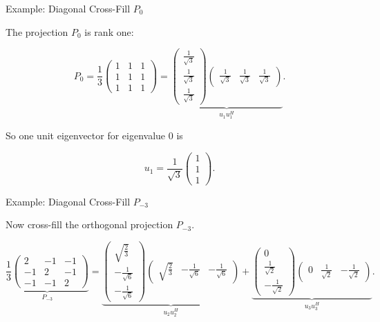 \documentclass[10pt]{beamer}
\theoremstyle{definition}
\begin{document}
\begin{frame}{Example: Diagonal Cross-Fill $P_0$}

The projection $P_0$ is rank one:

\[
P_0=
\frac13
\begin{pmatrix}
1&1&1\\
1&1&1\\
1&1&1
\end{pmatrix}
=
\underbrace{
\begin{pmatrix}
\frac1{\sqrt3}\\[0.2em]
\frac1{\sqrt3}\\[0.2em]
\frac1{\sqrt3}
\end{pmatrix}
\begin{pmatrix}
\frac1{\sqrt3}&\frac1{\sqrt3}&\frac1{\sqrt3}
\end{pmatrix}}_{u_1u_1^H}.
\]

\vfill

So one unit eigenvector for eigenvalue $0$ is

$$
u_1=\frac1{\sqrt3}\begin{pmatrix}1\\1\\1\end{pmatrix}.
$$

\end{frame}


\begin{frame}[shrink=16]{Example: Diagonal Cross-Fill $P_{-3}$}

Now cross-fill the orthogonal projection $P_{-3}$.

\[
\underbrace{
\frac13
\begin{pmatrix}
2&-1&-1\\
-1&2&-1\\
-1&-1&2
\end{pmatrix}}_{P_{-3}}
=
\underbrace{
\begin{pmatrix}
\sqrt{\frac23}\\[0.2em]
-\frac1{\sqrt6}\\[0.2em]
-\frac1{\sqrt6}
\end{pmatrix}
\begin{pmatrix}
\sqrt{\frac23}&-\frac1{\sqrt6}&-\frac1{\sqrt6}
\end{pmatrix}}_{u_2u_2^H}
+
\underbrace{
\begin{pmatrix}
0\\[0.2em]
\frac1{\sqrt2}\\[0.2em]
-\frac1{\sqrt2}
\end{pmatrix}
\begin{pmatrix}
0&\frac1{\sqrt2}&-\frac1{\sqrt2}
\end{pmatrix}}_{u_3u_3^H}.
\]

\end{frame}
\end{document}
